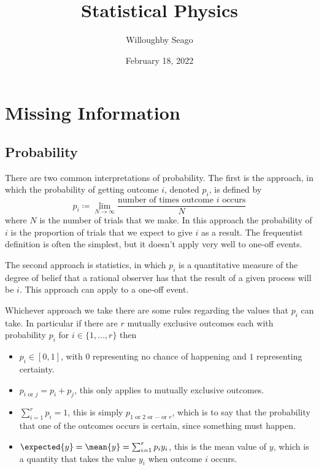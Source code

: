 \documentclass[fleqn]{NotesClass}
\title{Statistical Physics}
\author{Willoughby Seago}
\date{February 18, 2022}
\begin{document}
    \frontmatter
    \titlepage
    \tableofcontents
    \listoffigures
    \mainmatter
    
    \chapter{Missing Information}
    \section{Probability}
    There are two common interpretations of probability.
    The first is the  approach, in which the probability of getting outcome \(i\), denoted \(p_i\), is defined by
    \begin{equation}
        p_i \coloneqq \lim_{N \to \infty} \frac{\text{number of times outcome \(i\) occurs}}{N}
    \end{equation}
    where \(N\) is the number of trials that we make.
    In this approach the probability of \(i\) is the proportion of trials that we expect to give \(i\) as a result.
    The frequentist definition is often the simplest, but it doesn't apply very well to one-off events.
    
    The second approach is  statistics, in which \(p_i\) is a quantitative measure of the degree of belief that a rational observer has that the result of a given process will be \(i\).
    This approach can apply to a one-off event.
    
    Whichever approach we take there are some rules regarding the values that \(p_i\) can take.
    In particular if there are \(r\) mutually exclusive outcomes each with probability \(p_i\) for \(i \in \{1, \dotsc, r\}\) then
    \begin{itemize}
        \item \(p_i \in [0, 1]\), with \(0\) representing no chance of happening and \(1\) representing certainty.
        \item \(p_{i\text{ or } j} = p_i + p_j\), this only applies to mutually exclusive outcomes.
        \item \(\sum_{i=1}^{r} p_i = 1\), this is simply \(p_{1 \text{ or } 2 \text{ or } \dotsb \text{ or } r}\), which is to say that the probability that one of the outcomes occurs is certain, since something must happen.
        \item \(\expected{y} = \mean{y} = \sum_{i=1}^{r} p_iy_i\), this is the mean value of \(y\), which is a quantity that takes the value \(y_i\) when outcome \(i\) occurs.
    \end{itemize}
    
\end{document}

